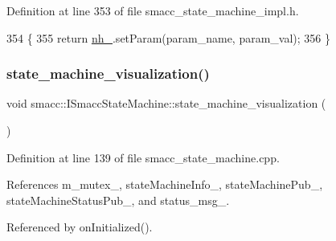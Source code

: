 Definition at line 353 of file smacc\+\_\+state\+\_\+machine\+\_\+impl.\+h.


\begin{DoxyCode}
354   \{
355     \textcolor{keywordflow}{return} \hyperlink{classsmacc_1_1ISmaccStateMachine_ad8877bcca9dbb345fe72cca839c93dd3}{nh\_}.setParam(param\_name, param\_val);
356   \}
\end{DoxyCode}
\mbox{\label{classsmacc_1_1ISmaccStateMachine_ac03029f770422d0ea77ea9856b8cb1a8}} 
\subsubsection{\texorpdfstring{state\+\_\+machine\+\_\+visualization()}{state\_machine\_visualization()}}
{\footnotesize\ttfamily void smacc\+::\+I\+Smacc\+State\+Machine\+::state\+\_\+machine\+\_\+visualization (\begin{DoxyParamCaption}\item[{const ros\+::\+Timer\+Event \&}]{ }\end{DoxyParamCaption})}



Definition at line 139 of file smacc\+\_\+state\+\_\+machine.\+cpp.



References m\+\_\+mutex\+\_\+, state\+Machine\+Info\+\_\+, state\+Machine\+Pub\+\_\+, state\+Machine\+Status\+Pub\+\_\+, and status\+\_\+msg\+\_\+.



Referenced by on\+Initialized().


